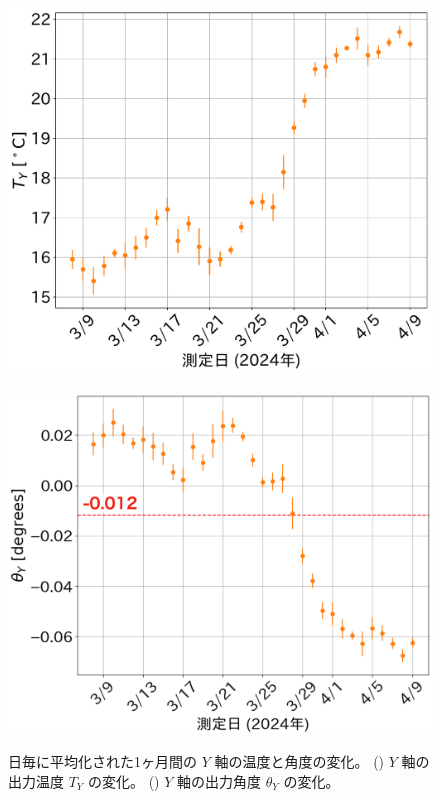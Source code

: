 \documentclass[../../main.tex]{subfiles}
\begin{document}
\begin{figure}[H]
    \begin{minipage}[b]{0.45\columnwidth}
        \centering
        \includegraphics[width=1.0\columnwidth]{tiltsensor/timedrift_tempY_daily.pdf}
        \subcaption{}
        \label{fig:timedrift_tempY}
    \end{minipage}
    \hspace{2mm}
    \begin{minipage}[b]{0.49\columnwidth}
        \centering
        \includegraphics[width=0.985\columnwidth]{tiltsensor/timedrift_angleY_daily.pdf}
        \subcaption{}
        \label{fig:timedrift_angleY}
    \end{minipage}
    \caption{日毎に平均化された1ヶ月間の $Y$ 軸の温度と角度の変化。
    () $Y$ 軸の出力温度 $T_{Y}$ の変化。
    () $Y$ 軸の出力角度 $\theta_{Y}$ の変化。}
    \label{fig:timedrift_Yaxis}
\end{figure}
\end{document}
